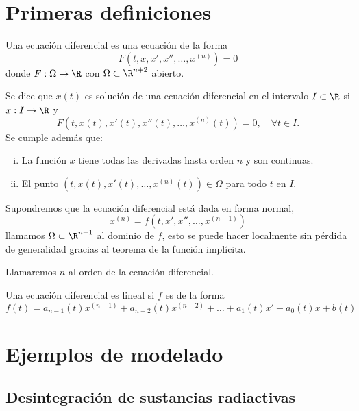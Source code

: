 \documentclass[../main.tex]{subfiles}
\begin{document}
\section{Primeras definiciones}

\begin{definition}
	Una ecuación diferencial es una ecuación de la forma
	\[F(t, x, x', x'', \dots, x^{(n)}) = 0\]
	donde \(F : \Omega \to \R\) con \(\Omega \subset \R^{n + 2}\) abierto.
\end{definition}

\begin{definition}
	Se dice que \(x(t)\) es solución de una ecuación diferencial en el intervalo
	\(I \subset \R\) si \(x : I \to \R\) y
	\[F(t, x(t), x'(t), x''(t), \dots, x^{(n)}(t)) = 0, \quad \forall t \in I.\]
	Se cumple además que:
	\begin{enumerate}[i)]
		\item La función \(x\) tiene todas las derivadas hasta orden \(n\) y son
			continuas.
		\item El punto \((t, x(t), x'(t), \dots, x^{(n)}(t)) \in \Omega\) para
			todo \(t\) en \(I\).
	\end{enumerate}
\end{definition}

Supondremos que la ecuación diferencial está dada en forma normal,
\[x^{(n)} = f(t, x', x'', \dots, x^{(n - 1)})\]
llamamos \(\Omega \subset \R^{n + 1}\) al dominio de \(f\), esto se puede hacer
localmente sin pérdida de generalidad gracias al teorema de la función
implícita.

\begin{remark}
	Llamaremos \(n\) al orden de la ecuación diferencial.
\end{remark}

\begin{definition}
	Una ecuación diferencial es lineal si \(f\) es de la forma
	\[f(t) = a_{n - 1}(t)x^{(n - 1)} + a_{n - 2}(t)x^{(n - 2)} +
		\dots + a_1(t)x' + a_0(t)x + b(t)\]
\end{definition}

\section{Ejemplos de modelado}

\subsection{Desintegración de sustancias radiactivas}
\end{document}
